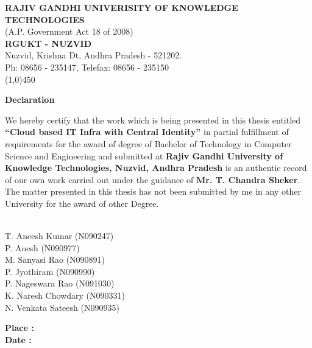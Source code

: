 \documentclass[12pt]{report}
\begin{document}
 \pagebreak
 
\thispagestyle{empty}
\begin{center}
  \textbf{RAJIV GANDHI UNIVERISITY OF KNOWLEDGE TECHNOLOGIES}  \\
 	(A.P. Government Act 18 of 2008) \\
 	\textbf{RGUKT - NUZVID} \\
 	Nuzvid, Krishna Dt, Andhra Pradesh - 521202. \\
 	Ph: 08656 - 235147, Telefax: 08656 - 235150 \\
 	\line(1,0){450}
\end{center}


\Large
\begin{center}
\textbf{Declaration}
\end{center}
\normalsize
\hspace{0.5cm} {We hereby certify that the work which is being presented in this thesis entitled \textbf{``Cloud based IT Infra with Central Identity''} in partial fulfillment of requirements for the award of degree of Bachelor of Technology in Computer Science and Engineering and submitted at \textbf{Rajiv Gandhi University of Knowledge Technologies, Nuzvid, Andhra Pradesh} is an authentic record of our own work carried out under the guidance  of \textbf{Mr. T. Chandra Sheker}. The matter presented in this thesis has not been submitted by me in any other University for the award of other Degree.}




\begin{flushright}
\underline{} \\
T. Aneesh Kumar (N090247) \\
P. Anesh (N090977) \\
M. Sanyasi Rao (N090891) \\
P. Jyothiram (N090990) \\
P. Nageswara Rao (N091030) \\
K. Naresh Chowdary (N090331) \\
N. Venkata Sateesh (N090935) \\
\end{flushright}




\hfill\break
\hfill\break
\hfill\break
\begin{flushleft}
\textbf{Place :} \underline{\hspace{5cm}} \\
\textbf{Date :} \underline{\hspace{5cm}}
\end{flushleft}
\end{document}
